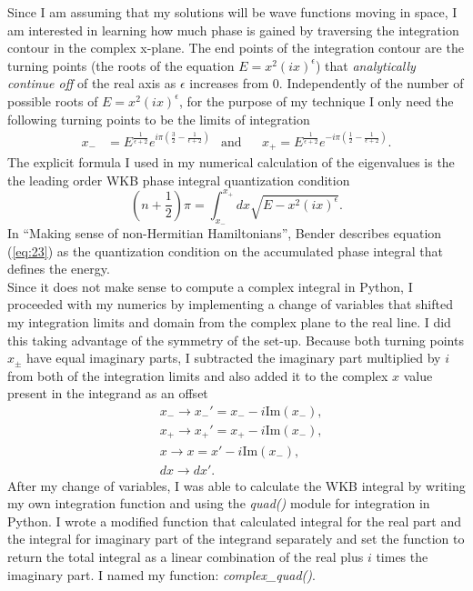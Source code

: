 \documentclass[10pt, a4paper, singlespacing]{report}
\begin{document}
Since I am assuming that my solutions will be wave functions moving in space, I am interested in learning how much phase is gained by traversing the integration contour in the complex x-plane. The end points of the integration contour are the turning points (the roots of the equation $E = x^2(ix)^{\epsilon}$) that \emph{analytically continue off} of the real axis as $\epsilon$ increases from $0$\cite{BenderPT}\cite{Bender}. Independently of the number of possible roots of $E = x^2(ix)^{\epsilon}$, for the purpose of my technique I only need the following turning points to be the limits of integration
\begin{align} \label{eq:22}
x_{-}& = 
E^{\frac{1}{\epsilon + 2}}
e^{i\pi(\frac{3}{2} - \frac{1}{\epsilon + 2})}
&\mathrm{and}&
&x_{+} = E^{\frac{1}{\epsilon + 2}} e^{-i\pi(\frac{1}{2} - \frac{1}{\epsilon + 2})}.
\end{align}
The explicit formula I used in my numerical calculation of the eigenvalues is the the leading order WKB phase integral quantization condition 
\begin{equation} \label{eq:23}
\left (n +\frac{1}{2}\right )\pi = \int^{x_{+}}_{x_{-}}dx \sqrt{E - x^2(ix)^{\epsilon}}.
\end{equation}
In ``Making sense of non-Hermitian Hamiltonians'', Bender describes equation (\ref{eq:23}) as the quantization condition on the accumulated phase integral that defines the energy.\\
Since it does not make sense to compute a complex integral in Python, I proceeded with my numerics by implementing a change of variables that shifted my integration limits and domain from the complex plane to the real line. I did this taking advantage of the symmetry of the set-up. Because both turning points $x_{\pm}$ have equal imaginary parts, I subtracted the imaginary part multiplied by $i$ from both of the integration limits and also added it to the complex $x$ value present in the integrand as an offset
\begin{equation} \label{eq:24}
\begin{split}
&x_{-}\rightarrow x_{-}' = x_{-} - i \mathrm{Im}(x_{-}),\\
&x_{+}\rightarrow x_{+}' = x_{+} - i \mathrm{Im}(x_{-}),\\
&x\rightarrow x = x' - i \mathrm{Im}(x_{-}),\\
&dx\rightarrow dx'.
\end{split}
\end{equation}
After my change of variables, I was able to calculate the WKB integral by writing my own integration function and using the \emph{quad()} module for integration in Python. I wrote a modified function that calculated integral for the real part and the integral for imaginary part of the integrand separately and set the function to return the total integral as a linear combination of the real plus $i$ times the imaginary part. I named my function: \emph{complex\_quad()}.\\
\end{document}
